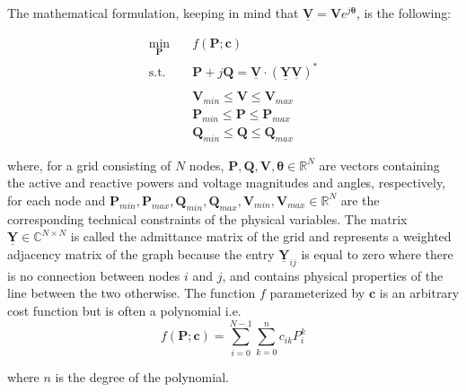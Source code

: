 The mathematical formulation, keeping in mind that $\boldsymbol{\underline{V}} = \boldsymbol{V}e^{j\boldsymbol{\theta}}$, is the following:

\newcommand{\complexpower}{\underline{\boldsymbol{V}} \cdot \left(\underline{\boldsymbol{Y}}\underline{\boldsymbol{V}}\right)^*}
\newcommand{\objectivefunction}{f(\boldsymbol{P}; \boldsymbol{c})}

\begin{equation}
    \label{eq:opf_formulation}
    \begin{aligned}
        \min_{\boldsymbol{P}} \quad & \objectivefunction\\%
        \textrm{s.t.} %
        \quad & \boldsymbol{P} + j\boldsymbol{Q} = \complexpower\\ \\
        \quad & \boldsymbol{V}_{min} \leq \boldsymbol{V} \leq \boldsymbol{V}_{max} \\
        \quad & \boldsymbol{P}_{min} \leq \boldsymbol{P} \leq \boldsymbol{P}_{max} \\
        \quad & \boldsymbol{Q}_{min} \leq \boldsymbol{Q} \leq \boldsymbol{Q}_{max}
    \end{aligned}
\end{equation}

\noindent where, for a grid consisting of $N$ nodes, $\boldsymbol{P}, \boldsymbol{Q}, \boldsymbol{V}, \boldsymbol{\theta} \in \mathbb{R}^N$ are vectors containing the
active and reactive powers and voltage magnitudes and angles, respectively, for each node and
$\boldsymbol{P}_{min}, \boldsymbol{P}_{max}, \boldsymbol{Q}_{min}, \boldsymbol{Q}_{max}, \boldsymbol{V}_{min}, \boldsymbol{V}_{max} \in \mathbb{R}^N$
are the corresponding technical constraints of the physical variables.
The matrix $\boldsymbol{\underline{Y}} \in \mathbb{C}^{N \times N}$ is called the admittance matrix
of the grid and represents a weighted adjacency matrix of the graph because the entry $\boldsymbol{\underline{Y}}_{ij}$ is equal
to zero where there is no connection between nodes $i$ and $j$, and contains physical properties of the line between the two otherwise.
The function $f$ parameterized by $\boldsymbol{c}$ is an arbitrary cost function but is often a polynomial i.e.
\[f(\boldsymbol{P}; \boldsymbol{c}) = \sum_{i=0}^{N - 1} \sum_{k=0}^n c_{ik}P_i^k\]

\noindent where $n$ is the degree of the polynomial.